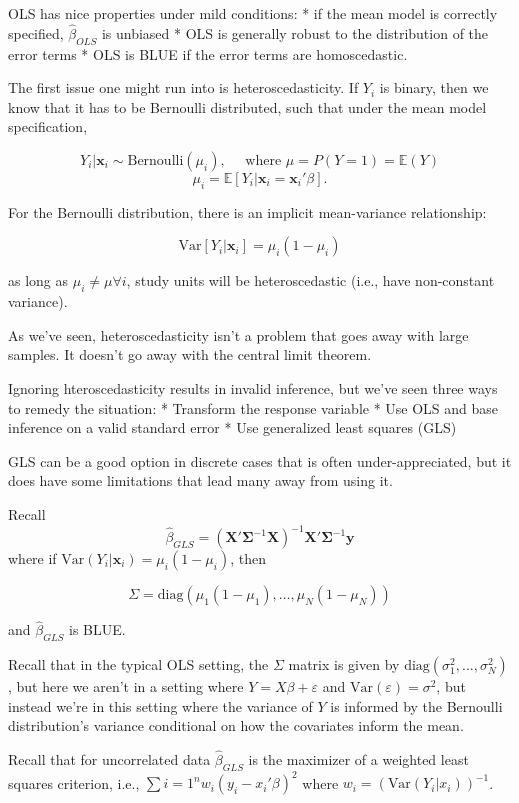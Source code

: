 \documentclass[
  letterpaper,
  DIV=11,
  numbers=noendperiod]{scrreport}
\begin{document}
OLS has nice properties under mild conditions: * if the mean model is
correctly specified, \(\hat \beta_{OLS}\) is unbiased * OLS is generally
robust to the distribution of the error terms * OLS is BLUE if the error
terms are homoscedastic.

The first issue one might run into is heteroscedasticity. If \(Y_i\) is
binary, then we know that it has to be Bernoulli distributed, such that
under the mean model specification,

\[Y_i | \mathbf{x}_i \sim \text{Bernoulli}(\mu_i), \quad \text{ where } \mu = P(Y = 1) = \mathbb E(Y)\]
\[ \mu_i = \mathbb E[Y_i | \mathbf{x}_i = \mathbf{x}_i' \beta]. \]

For the Bernoulli distribution, there is an implicit mean-variance
relationship:

\[\text{Var}[Y_i | \mathbf{x}_i] = \mu_i (1 - \mu_i)\]

as long as \(\mu_i \neq \mu \forall i\), study units will be
heteroscedastic (i.e., have non-constant variance).

As we've seen, heteroscedasticity isn't a problem that goes away with
large samples. It doesn't go away with the central limit theorem.

Ignoring hteroscedasticity results in invalid inference, but we've seen
three ways to remedy the situation: * Transform the response variable *
Use OLS and base inference on a valid standard error * Use generalized
least squares (GLS)

GLS can be a good option in discrete cases that is often
under-appreciated, but it does have some limitations that lead many away
from using it.

Recall
\[\hat \beta_{GLS} = (\mathbf{X}'\mathbf{\Sigma}^{-1}\mathbf{X})^{-1} \mathbf{X}' \mathbf{\Sigma}^{-1} \mathbf{y}\]
where if \(\text{Var}(Y_i | \mathbf{x}_i) = \mu_i (1-\mu_i)\), then

\[\Sigma = \text{diag}(\mu_1(1-\mu_1), ..., \mu_N(1-\mu_N))\]

and \(\hat \beta_{GLS}\) is BLUE.

Recall that in the typical OLS setting, the \(\Sigma\) matrix is given
by \(\text{diag}(\sigma_1^2, ..., \sigma_N^2)\), but here we aren't in a
setting where \(Y = X \beta + \varepsilon\) and
\(\text{Var}(\varepsilon) = \sigma^2\), but instead we're in this
setting where the variance of \(Y\) is informed by the Bernoulli
distribution's variance conditional on how the covariates inform the
mean.

Recall that for uncorrelated data \(\hat \beta_{GLS}\) is the maximizer
of a weighted least squares criterion, i.e.,
\(\sum{i=1}^n w_i (y_i - x_i' \beta)^2\) where
\(w_i = (\text{Var}(Y_i | x_i))^{-1}\).
\end{document}
